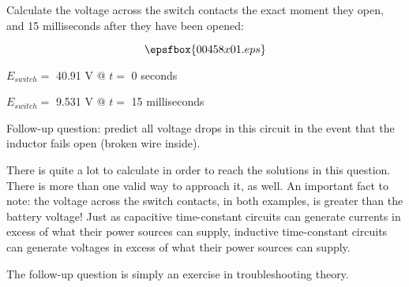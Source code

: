 

Calculate the voltage across the switch contacts the exact moment they open, and 15 milliseconds after they have been opened:

$$\epsfbox{00458x01.eps}$$







$E_{switch} =$ 40.91 V @ $t =$ 0 seconds

$E_{switch} =$ 9.531 V @ $t =$ 15 milliseconds

\vskip 10pt

Follow-up question: predict all voltage drops in this circuit in the event that the inductor fails open (broken wire inside).







There is quite a lot to calculate in order to reach the solutions in this question.  There is more than one valid way to approach it, as well.  An important fact to note: the voltage across the switch contacts, in both examples, is greater than the battery voltage!  Just as capacitive time-constant circuits can generate currents in excess of what their power sources can supply, inductive time-constant circuits can generate voltages in excess of what their power sources can supply.

The follow-up question is simply an exercise in troubleshooting theory.




